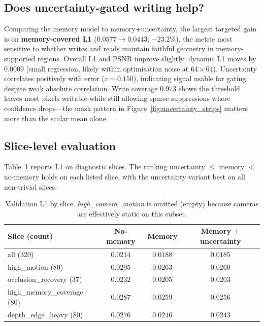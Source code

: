 \documentclass[11pt]{article}
\begin{document}
\subsection{Does uncertainty-gated writing help?}

Comparing the memory model to memory+uncertainty, the largest targeted gain is on \textbf{memory-covered L1}
($0.0577\!\rightarrow\!0.0443$; $-23.2\%$), the metric most sensitive to whether writes and reads maintain
faithful geometry in memory-supported regions. Overall L1 and PSNR improve slightly; dynamic L1 moves by
$0.0009$ (small regression, likely within optimisation noise at $64\times64$).
Uncertainty correlates positively with error ($r{=}0.150$), indicating signal usable for gating despite weak
absolute correlation. Write coverage $0.973$ shows the threshold leaves most pixels writable while still
allowing sparse suppressions where confidence drops---the mask pattern in Figure~\ref{fig:uncertainty_strips}
matters more than the scalar mean alone.

\subsection{Slice-level evaluation}

Table~\ref{tab:slices} reports L1 on diagnostic slices. The ranking
uncertainty $\le$ memory $<$ no-memory holds on each listed slice, with the uncertainty variant best on
all non-trivial slices.

\begin{table}[!htb]
\centering
\small
\begin{tabular}{lccc}
\toprule
Slice (count) & No-memory & Memory & Memory + uncertainty \\
\midrule
all (320) & $0.0214$ & $0.0188$ & $\mathbf{0.0185}$ \\
high\_motion (80) & $0.0295$ & $0.0263$ & $\mathbf{0.0260}$ \\
occlusion\_recovery (37) & $0.0232$ & $0.0205$ & $\mathbf{0.0203}$ \\
high\_memory\_coverage (80) & $0.0287$ & $0.0259$ & $\mathbf{0.0256}$ \\
depth\_edge\_heavy (80) & $0.0276$ & $0.0246$ & $\mathbf{0.0243}$ \\
\bottomrule
\end{tabular}
\caption{Validation L1 by slice. \emph{high\_camera\_motion} is omitted (empty) because cameras are
effectively static on this subset.}
\label{tab:slices}
\end{table}
\end{document}
